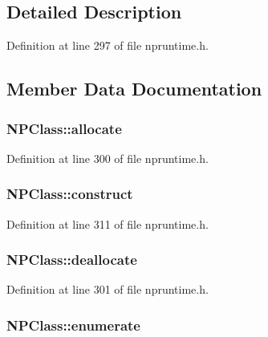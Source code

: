 \subsection{Detailed Description}


Definition at line 297 of file npruntime.h.



\subsection{Member Data Documentation}
\hypertarget{struct_n_p_class_aadb6db95a941e877d1bcdd16d4546464}{
\subsubsection[{allocate}]{ {\bf NPClass::allocate}}}
\label{struct_n_p_class_aadb6db95a941e877d1bcdd16d4546464}


Definition at line 300 of file npruntime.h.

\hypertarget{struct_n_p_class_a56806740859bd4e6e3e8262a43208cfd}{
\subsubsection[{construct}]{ {\bf NPClass::construct}}}
\label{struct_n_p_class_a56806740859bd4e6e3e8262a43208cfd}


Definition at line 311 of file npruntime.h.

\hypertarget{struct_n_p_class_a9d6f7068e17c4788fc7057c4c96f0732}{
\subsubsection[{deallocate}]{ {\bf NPClass::deallocate}}}
\label{struct_n_p_class_a9d6f7068e17c4788fc7057c4c96f0732}


Definition at line 301 of file npruntime.h.

\hypertarget{struct_n_p_class_ad1e58581066ef685a5a82c7227a4b27a}{
\subsubsection[{enumerate}]{ {\bf NPClass::enumerate}}}
\label{struct_n_p_class_ad1e58581066ef685a5a82c7227a4b27a}


